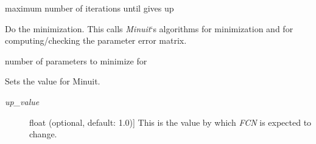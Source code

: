 \documentclass[a4paper,10pt,english]{sphinxmanual}
\begin{document}
\begin{fulllineitems}
\begin{fulllineitems}
\begin{description}
\end{description}

\end{fulllineitems}


\begin{fulllineitems}
\label{index:kafe.minuit.Minuit.max_iterations}
maximum number of iterations until  gives up

\end{fulllineitems}


\begin{fulllineitems}
\label{index:kafe.minuit.Minuit.minimize}
Do the minimization. This calls \emph{Minuit}`s algorithms  for minimization
and  for computing/checking the parameter error matrix.

\end{fulllineitems}


\begin{fulllineitems}
\label{index:kafe.minuit.Minuit.number_of_parameters}
number of parameters to minimize for

\end{fulllineitems}


\begin{fulllineitems}
\label{index:kafe.minuit.Minuit.reset}
\end{fulllineitems}


\begin{fulllineitems}
\label{index:kafe.minuit.Minuit.set_err}
Sets the  value for Minuit.
\begin{description}
\item[{\emph{up\_value}}] \leavevmode{[}float (optional, default: 1.0){]}
This is the value by which \emph{FCN} is expected to change.

\end{description}


\end{fulllineitems}
\end{fulllineitems}
\end{document}
